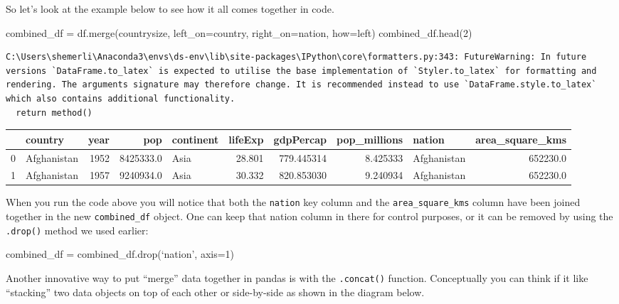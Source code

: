 \documentclass[
  letterpaper,
  DIV=11,
  numbers=noendperiod]{scrreprt}
\newenvironment{Shaded}{\begin{snugshade}}{\end{snugshade}}
\newcommand{\DecValTok}[1]{\textcolor[rgb]{0.68,0.00,0.00}{#1}}
\newcommand{\NormalTok}[1]{\textcolor[rgb]{0.00,0.23,0.31}{#1}}
\newcommand{\OperatorTok}[1]{\textcolor[rgb]{0.37,0.37,0.37}{#1}}
\newcommand{\StringTok}[1]{\textcolor[rgb]{0.13,0.47,0.30}{#1}}
\begin{document}
So let's look at the example below to see how it all comes together in
code.

\begin{Shaded}
\begin{Highlighting}[]
\NormalTok{combined\_df }\OperatorTok{=}\NormalTok{ df.merge(countrysize, left\_on}\OperatorTok{=}\StringTok{\textquotesingle{}country\textquotesingle{}}\NormalTok{, right\_on}\OperatorTok{=}\StringTok{\textquotesingle{}nation\textquotesingle{}}\NormalTok{, how}\OperatorTok{=}\StringTok{\textquotesingle{}left\textquotesingle{}}\NormalTok{)}
\NormalTok{combined\_df.head(}\DecValTok{2}\NormalTok{)}
\end{Highlighting}
\end{Shaded}

\begin{verbatim}
C:\Users\shemerli\Anaconda3\envs\ds-env\lib\site-packages\IPython\core\formatters.py:343: FutureWarning: In future versions `DataFrame.to_latex` is expected to utilise the base implementation of `Styler.to_latex` for formatting and rendering. The arguments signature may therefore change. It is recommended instead to use `DataFrame.style.to_latex` which also contains additional functionality.
  return method()
\end{verbatim}

\begin{tabular}{llrrlrrrlr}
\toprule
{} &      country &  year &        pop & continent &  lifeExp &   gdpPercap &  pop\_millions &       nation &  area\_square\_kms \\
\midrule
0 &  Afghanistan &  1952 &  8425333.0 &      Asia &   28.801 &  779.445314 &      8.425333 &  Afghanistan &         652230.0 \\
1 &  Afghanistan &  1957 &  9240934.0 &      Asia &   30.332 &  820.853030 &      9.240934 &  Afghanistan &         652230.0 \\
\bottomrule
\end{tabular}

When you run the code above you will notice that both the
\texttt{nation} key column and the \texttt{area\_square\_kms} column
have been joined together in the new \texttt{combined\_df} object. One
can keep that nation column in there for control purposes, or it can be
removed by using the \texttt{.drop()} method we used earlier:

combined\_df = combined\_df.drop(`nation', axis=1)

Another innovative way to put ``merge'' data together in pandas is with
the \texttt{.concat()} function. Conceptually you can think if it like
``stacking'' two data objects on top of each other or side-by-side as
shown in the diagram below.
\end{document}
